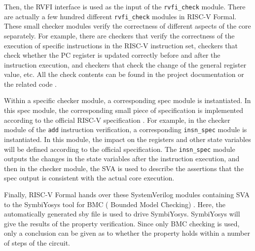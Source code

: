 \documentclass[conference]{IEEEtran}
\theoremstyle{definition}
\begin{document}
Then, the RVFI interface is used as the input of the \verb|rvfi_check| module.
There are actually a few hundred different \verb|rvfi_check| modules in RISC-V Formal.
These small checker modules verify the correctness of different aspects of the core separately.
For example, there are checkers that verify the correctness of the execution of specific instructions in the RISC-V instruction set, checkers that check whether the PC register is updated correctly before and after the instruction execution, and checkers that check the change of the general register value, etc.
All the check contents can be found in the project documentation or the related code \cite{riscv-formal}.

Within a specific checker module, a corresponding spec module is instantiated. In this spec module, the corresponding small piece of specification is implemented according to the official RISC-V specification \cite{waterman2014risc}.
For example, in the checker module of the \verb|add| instruction verification, a corresponding \verb|insn_spec| module is instantiated.
In this module, the impact on the registers and other state variables will be defined according to the official specification.
The \verb|insn_spec| module outputs the changes in the state variables after the instruction execution, and then in the checker module, the SVA is used to describe the assertions that the spec output is consistent with the actual core execution.

Finally, RISC-V Formal hands over these SystemVerilog modules containing SVA to the SymbiYosys tool for BMC ( Bounded Model Checking) \cite{biere2009bounded}.
Here, the automatically generated sby file is used to drive SymbiYosys.
SymbiYosys will give the results of the property verification. Since only BMC checking is used, only a conclusion can be given as to whether the property holds within a number of steps of the circuit.
\end{document}
